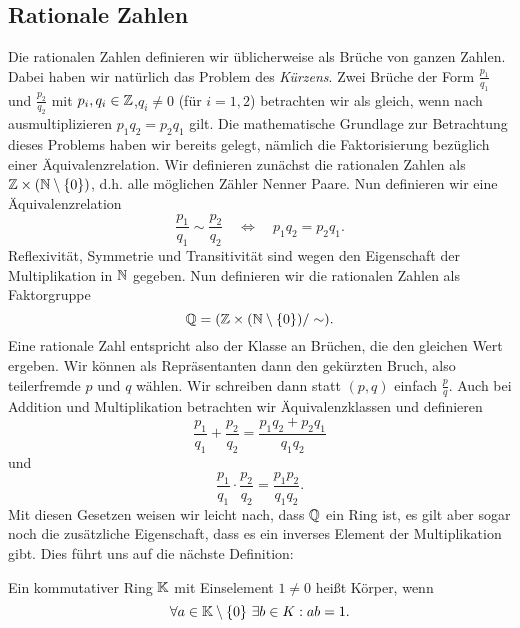 \subsection{Rationale Zahlen}
\label{\detokenize{grundlagen/zahlensysteme:rationale-zahlen}}
Die rationalen Zahlen definieren wir üblicherweise als Brüche von ganzen Zahlen. Dabei haben wir natürlich das Problem des \emph{Kürzens}. Zwei Brüche der Form \(\frac{p_1}{q_1}\) und \(\frac{p_2}{q_2}\) mit \(p_i, q_i \in \mathbb{Z}\),\(q_i \neq 0\) (für \(i=1,2\)) betrachten wir als gleich, wenn nach ausmultiplizieren
\(p_1 q_2= p_2 q_1\) gilt.
Die mathematische Grundlage zur Betrachtung dieses Problems haben wir bereits gelegt, nämlich die Faktorisierung bezüglich einer Äquivalenzrelation. Wir definieren zunächst die rationalen Zahlen als \(\mathbb{Z} \times (\mathbb{N} \setminus \{0\})\), d.h. alle möglichen Zähler Nenner Paare. Nun definieren wir eine Äquivalenzrelation
\begin{equation*}
\frac{p_1}{q_1} \sim \frac{p_2}{q_2}  \quad \Leftrightarrow \quad p_1 q_2= p_2 q_1.
\end{equation*}
Reflexivität, Symmetrie und Transitivität sind wegen den Eigenschaft der Multiplikation in \(\mathbb{N}\) gegeben.
Nun definieren wir die rationalen Zahlen als Faktorgruppe
\begin{equation*}
\mathbb{Q} = ( \mathbb{Z} \times (\mathbb{N} \setminus \{0\}) /  \sim).
\end{equation*}
Eine rationale Zahl entspricht also der Klasse an Brüchen, die den gleichen Wert ergeben. Wir können als Repräsentanten dann den gekürzten Bruch, also teilerfremde \(p\) und \(q\) wählen. Wir schreiben dann statt \((p,q)\) einfach \(\frac{p}q\). Auch bei Addition und Multiplikation betrachten wir Äquivalenzklassen und definieren
\begin{equation*}
 \frac{p_1}{q_1} +   \frac{p_2}{q_2}  = \frac{p_1 q_2 + p_2 q_1}{q_1q_2}
\end{equation*}
und
\begin{equation*}
 \frac{p_1}{q_1}  \cdot  \frac{p_2}{q_2}  = \frac{p_1   p_2  }{q_1q_2} .
\end{equation*}
Mit diesen Gesetzen weisen wir leicht nach, dass \(\mathbb{Q}\) ein Ring ist, es gilt aber sogar noch die zusätzliche Eigenschaft, dass es ein inverses Element der Multiplikation gibt. Dies führt uns auf die nächste Definition:
\label{grundlagen/zahlensysteme:definition-9}
\begin{definition}{}{}



Ein kommutativer Ring \(\mathbb{K}\) mit Einselement \(1 \neq 0\) heißt Körper, wenn
\begin{equation*}
 \forall a \in\mathbb{K} \setminus \{0\} ~\exists b \in K:  a b = 1.
\end{equation*}\end{definition}

